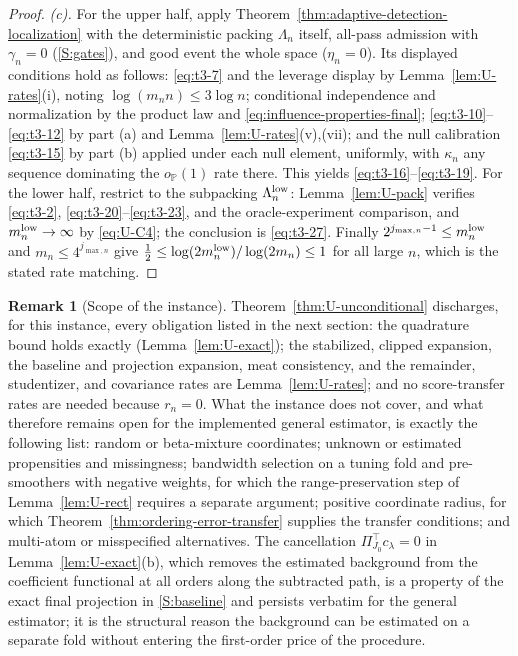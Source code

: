 \documentclass[11pt]{article}
\theoremstyle{definition}
\newtheorem{remark}[definition]{Remark}
\newcommand{\1}{\mathbf 1}\newcommand{\op}{\operatorname}
\begin{document}
\begin{proof}
\emph{(c).}  For the upper half, apply
Theorem~\ref{thm:adaptive-detection-localization} with the deterministic
packing $\Lambda_n$ itself, all-pass admission with $\gamma_n=0$
(\ref{S:gates}), and good event the whole space ($\eta_n=0$).  Its displayed
conditions hold as follows: \eqref{eq:t3-7} and the leverage display by
Lemma~\ref{lem:U-rates}(i), noting $\log(m_nn)\le3\log n$; conditional
independence and normalization by the product law and
\eqref{eq:influence-properties-final}; \eqref{eq:t3-10}--\eqref{eq:t3-12} by
part (a) and Lemma~\ref{lem:U-rates}(v),(vii); and the null calibration
\eqref{eq:t3-15} by part (b) applied under each null element, uniformly, with
$\kappa_n$ any sequence dominating the $o_{\mathbb P}(1)$ rate there.  This
yields \eqref{eq:t3-16}--\eqref{eq:t3-19}.  For the lower half, restrict to
the subpacking $\Lambda_n^{\rm low}$: Lemma~\ref{lem:U-pack} verifies
\eqref{eq:t3-2}, \eqref{eq:t3-20}--\eqref{eq:t3-23}, and the oracle-experiment
comparison, and $m_n^{\rm low}\to\infty$ by \eqref{eq:U-C4}; the conclusion is
\eqref{eq:t3-27}.  Finally $2^{j_{\max,n}-1}\le m_n^{\rm low}$ and
$m_n\le4^{j_{\max,n}}$ give
$\tfrac12\le\log(2m_n^{\rm low})/\log(2m_n)\le1$ for all large $n$, which is
the stated rate matching.
\end{proof}

\begin{remark}[Scope of the instance]\label{rem:U-scope}
Theorem~\ref{thm:U-unconditional} discharges, for this instance, every
obligation listed in the next section: the quadrature bound holds exactly
(Lemma~\ref{lem:U-exact}); the stabilized, clipped expansion, the baseline and
projection expansion, meat consistency, and the remainder, studentizer, and
covariance rates are Lemma~\ref{lem:U-rates}; and no score-transfer rates are
needed because $r_n=0$.  What the instance does not cover, and what therefore
remains open for the implemented general estimator, is exactly the following
list: random or beta-mixture coordinates; unknown or estimated propensities and
missingness; bandwidth selection on a tuning fold and pre-smoothers with
negative weights, for which the range-preservation step of
Lemma~\ref{lem:U-rect} requires a separate argument; positive coordinate
radius, for which Theorem~\ref{thm:ordering-error-transfer} supplies the
transfer conditions; and multi-atom or misspecified alternatives.  The
cancellation $\Pi_{J_0}^\top c_\lambda=0$ in Lemma~\ref{lem:U-exact}(b), which
removes the estimated background from the coefficient functional at all orders
along the subtracted path, is a property of the exact final projection in
\ref{S:baseline} and persists verbatim for the general estimator; it is the
structural reason the background can be estimated on a separate fold without
entering the first-order price of the procedure.
\end{remark}
\end{document}
